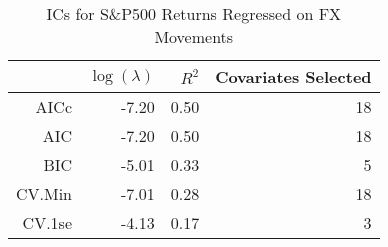 \begin{table}[ht]
\centering
\begin{tabular}{rrrr}
  \hline
 & $\log(\lambda)$ & $R^2$ & Covariates Selected \\ 
  \hline
AICc & -7.20 & 0.50 &  18 \\ 
  AIC & -7.20 & 0.50 &  18 \\ 
  BIC & -5.01 & 0.33 &   5 \\ 
  CV.Min & -7.01 & 0.28 &  18 \\ 
  CV.1se & -4.13 & 0.17 &   3 \\ 
   \hline
\end{tabular}
\caption{ICs for S\&P500 Returns Regressed on FX Movements} 
\label{tab:spregfx_ics}
\end{table}

